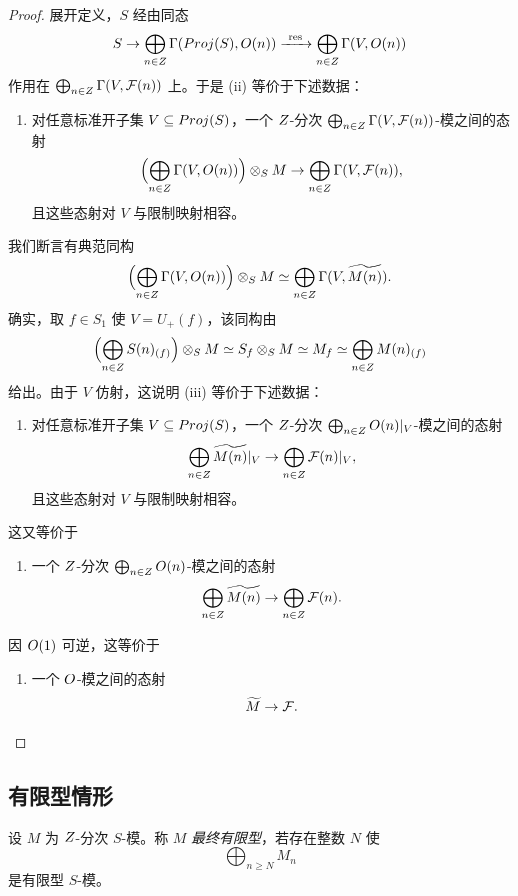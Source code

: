 \begin{proof}
展开定义，$S$ 经由同态
\[
S \to \bigoplus_{n \in Z} \Gamma(Proj(S), O(n)) \xrightarrow{\ \mathrm{res}\ } \bigoplus_{n \in Z} \Gamma(V, O(n))
\]
作用在 $\bigoplus_{n \in Z} \Gamma(V, \mathcal{F}(n))$ 上。于是 (ii) 等价于下述数据：
\begin{enumerate}[label=(\roman*),start=3,leftmargin=2.6em,itemsep=0.25ex]
  \item 对任意标准开子集 $V \subseteq Proj(S)$，一个 $Z$-分次 $\bigoplus_{n \in Z} \Gamma(V, \mathcal{F}(n))$-模之间的态射
  \[
  \Bigl(\bigoplus_{n \in Z} \Gamma(V, O(n))\Bigr) \otimes_S M \to \bigoplus_{n \in Z} \Gamma(V, \mathcal{F}(n)),
  \]
  且这些态射对 $V$ 与限制映射相容。
\end{enumerate}
我们断言有典范同构
\[
\Bigl(\bigoplus_{n \in Z} \Gamma(V, O(n))\Bigr) \otimes_S M \simeq \bigoplus_{n \in Z} \Gamma(V, \widetilde{M(n)}).
\]
确实，取 $f \in S_1$ 使 $V = U_+(f)$，该同构由
\[
\Bigl(\bigoplus_{n \in Z} S(n)_{(f)}\Bigr) \otimes_S M \simeq S_f \otimes_S M \simeq M_f \simeq \bigoplus_{n \in Z} M(n)_{(f)}
\]
给出。由于 $V$ 仿射，这说明 (iii) 等价于下述数据：
\begin{enumerate}[label=(\roman*),start=4,leftmargin=2.6em,itemsep=0.25ex]
  \item 对任意标准开子集 $V \subseteq Proj(S)$，一个 $Z$-分次 $\bigoplus_{n \in Z} O(n)|_V$-模之间的态射
  \[
  \bigoplus_{n \in Z} \widetilde{M(n)}|_V \to \bigoplus_{n \in Z} \mathcal{F}(n)|_V,
  \]
  且这些态射对 $V$ 与限制映射相容。
\end{enumerate}
这又等价于
\begin{enumerate}[label=(\roman*),start=5,leftmargin=2.6em,itemsep=0.25ex]
  \item 一个 $Z$-分次 $\bigoplus_{n \in Z} O(n)$-模之间的态射
  \[
  \bigoplus_{n \in Z} \widetilde{M(n)} \to \bigoplus_{n \in Z} \mathcal{F}(n).
  \]
\end{enumerate}
因 $O(1)$ 可逆，这等价于
\begin{enumerate}[label=(\roman*),start=6,leftmargin=2.6em,itemsep=0.25ex]
  \item 一个 $O$-模之间的态射
  \[
  \widetilde{M} \to \mathcal{F}.
  \]
\end{enumerate}
\end{proof}

\subsection{有限型情形}\label{sec:26.4}

\begin{definition}\label{def:26.4.1}
设 $M$ 为 $Z$-分次 $S$-模。称 $M$ \emph{最终有限型}，若存在整数 $N$ 使
\[
\bigoplus_{n \ge N} M_n
\]
是有限型 $S$-模。
\end{definition}

